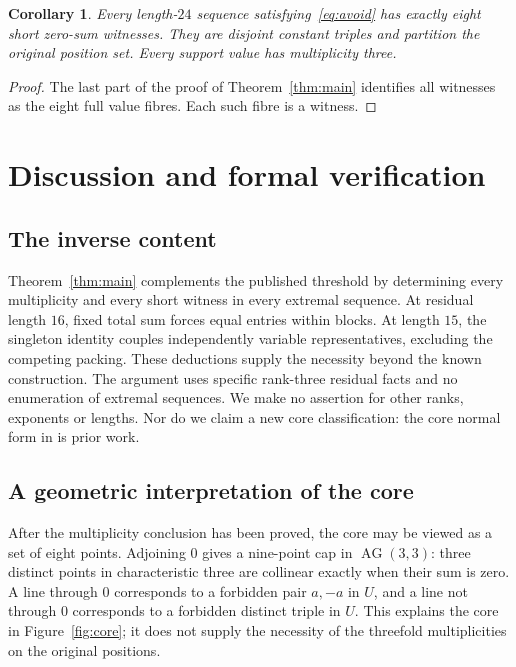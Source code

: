 \documentclass[11pt]{article}
\newtheorem{corollary}[theorem]{Corollary}
\theoremstyle{definition}
\theoremstyle{remark}
\begin{document}
\begin{corollary}\label{cor:witnesses}
Every length-$24$ sequence satisfying~\eqref{eq:avoid} has exactly eight
short zero-sum witnesses. They are disjoint constant triples and partition
the original position set. Every support value has multiplicity three.
\end{corollary}
\begin{proof}
The last part of the proof of Theorem~\ref{thm:main} identifies all witnesses
as the eight full value fibres. Each such fibre is a witness.
\end{proof}

\section{Discussion and formal verification}
\subsection{The inverse content}
Theorem~\ref{thm:main} complements the published threshold by determining
every multiplicity and every short witness in every extremal sequence.
At residual length $16$, fixed total sum forces equal entries within
blocks. At length $15$, the singleton identity couples independently
variable representatives, excluding the competing packing.
These deductions supply the necessity beyond the known construction.
The argument uses specific rank-three residual facts and no enumeration
of extremal sequences. We make no assertion for other ranks, exponents
or lengths. Nor do we claim a new core classification: the core normal
form in \cite[Lemma 9]{Fan2012} is prior work.

\subsection{A geometric interpretation of the core}
After the multiplicity conclusion has been proved, the core may be viewed
as a set of eight points. Adjoining $0$ gives a nine-point cap in
$\operatorname{AG}(3,3)$: three distinct points in characteristic three
are collinear exactly when their sum is zero. A line through $0$
corresponds to a forbidden pair $a,-a$ in $U$, and a line not through
$0$ corresponds to a forbidden distinct triple in $U$.
This explains the core in Figure~\ref{fig:core}; it does not supply the
necessity of the threefold multiplicities on the original positions.
\end{document}
